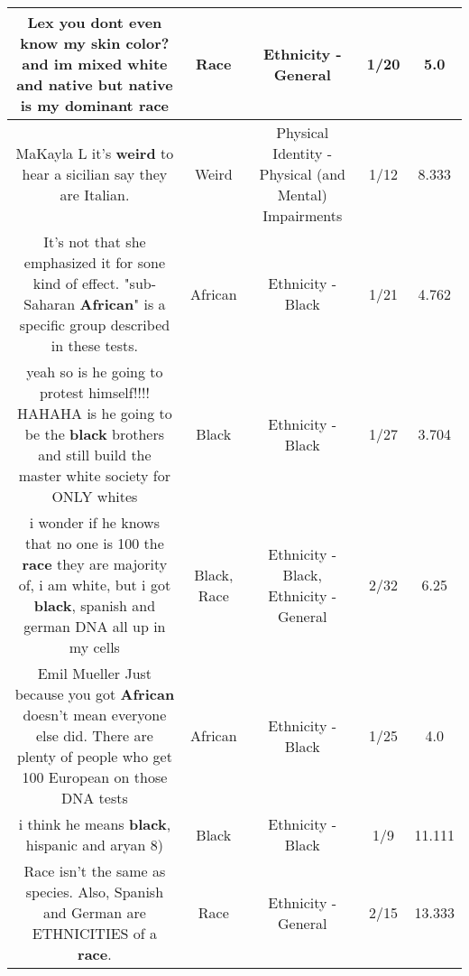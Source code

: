 \documentclass[11pt]{article}
\newlength\mylength
\begin{document}
\begin{center}
\begin{longtable}{|C{.65\mylength}|C{.30\mylength}|C{.12\mylength}|C{.12\mylength}|C{.12\mylength}|}
  \small Lex you dont even know my skin color? and im mixed white and native but native is my dominant race\normalsize   & Race & Ethnicity - General & 1/20 & 5.0 \\  \hline
  \small MaKayla L it's \textbf{weird} to hear a sicilian say they are Italian.\normalsize   & Weird & Physical Identity - Physical (and Mental) Impairments & 1/12 & 8.333 \\  \hline
  \small It's not that she emphasized it for sone kind of effect. "sub-Saharan \textbf{African}" is a specific group described in these tests.\normalsize   & African & Ethnicity - Black & 1/21 & 4.762 \\  \hline
  \small yeah so is he going to protest himself!!!! HAHAHA  is he going to be the \textbf{black} brothers and still build the master white society for ONLY whites\normalsize   & Black & Ethnicity - Black & 1/27 & 3.704 \\  \hline
  \small i wonder if he knows that no one is 100 the \textbf{race} they are majority of, i am white, but i got \textbf{black}, spanish and german DNA all up in my cells\normalsize   & Black, Race & Ethnicity - Black, Ethnicity - General & 2/32 & 6.25 \\  \hline
  \small Emil Mueller Just because you got \textbf{African} doesn't mean everyone else did. There are plenty of people who get 100 European on those DNA tests\normalsize   & African & Ethnicity - Black & 1/25 & 4.0 \\  \hline
  \small i think he means \textbf{black}, hispanic and aryan 8)\normalsize   & Black & Ethnicity - Black & 1/9 & 11.111 \\  \hline
  \small Race isn't the same as species. Also, Spanish and German are ETHNICITIES of a \textbf{race}.\normalsize   & Race & Ethnicity - General & 2/15 & 13.333 \\  \hline

\end{longtable}
\end{center}
\end{document}

